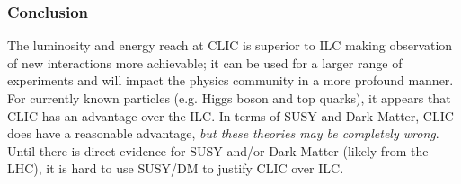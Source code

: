 	
\subsubsection{Conclusion}
The luminosity and energy reach at CLIC is superior to ILC making observation of new interactions more achievable; it can be used for a larger range of experiments and will impact the physics community in a more profound manner. For currently known particles (e.g. Higgs boson and top quarks), it appears that CLIC has an advantage over the ILC. In terms of SUSY and Dark Matter, CLIC does have a reasonable advantage, {\em but these theories may be completely wrong}. Until there is direct evidence for SUSY and/or Dark Matter (likely from the LHC), it is hard to use SUSY/DM to justify CLIC over ILC.